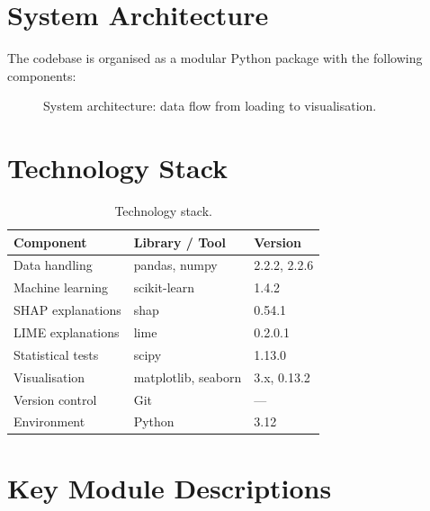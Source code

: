 \documentclass[12pt, a4paper, oneside]{report}
\theoremstyle{definition}
\begin{document}

\section{System Architecture}

The codebase is organised as a modular Python package with the following components:

\begin{figure}[htbp]
  \centering
  \caption{System architecture: data flow from loading to visualisation.}
  \label{fig:architecture}
\end{figure}

\section{Technology Stack}

\begin{table}[htbp]
  \centering
  \caption{Technology stack.}
  \label{tab:tech}
  \begin{tabular}{lll}
    \toprule
    Component & Library / Tool & Version \\
    \midrule
    Data handling     & pandas, numpy   & 2.2.2, 2.2.6 \\
    Machine learning  & scikit-learn    & 1.4.2 \\
    SHAP explanations & shap            & 0.54.1 \\
    LIME explanations & lime            & 0.2.0.1 \\
    Statistical tests & scipy           & 1.13.0 \\
    Visualisation     & matplotlib, seaborn & 3.x, 0.13.2 \\
    Version control   & Git             & --- \\
    Environment       & Python          & 3.12 \\
    \bottomrule
  \end{tabular}
\end{table}

\section{Key Module Descriptions}
\end{document}
